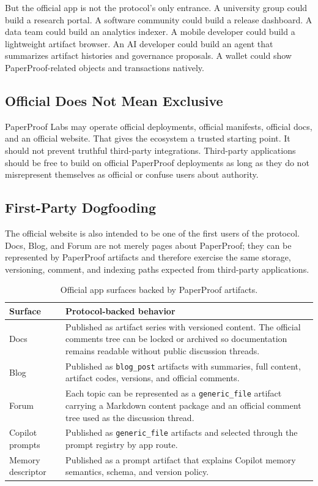 \documentclass[11pt]{article}
\newcommand{\code}[1]{\texttt{#1}}
\begin{document}
But the official app is not the protocol's only entrance. A university group
could build a research portal. A software community could build a release
dashboard. A data team could build an analytics indexer. A mobile developer
could build a lightweight artifact browser. An AI developer could build an agent
that summarizes artifact histories and governance proposals. A wallet could show
PaperProof-related objects and transactions natively.

\subsection{Official Does Not Mean Exclusive}

PaperProof Labs may operate official deployments, official manifests, official
docs, and an official website. That gives the ecosystem a trusted starting
point. It should not prevent truthful third-party integrations. Third-party
applications should be free to build on official PaperProof deployments as long
as they do not misrepresent themselves as official or confuse users about
authority.

\subsection{First-Party Dogfooding}

The official website is also intended to be one of the first users of the
protocol. Docs, Blog, and Forum are not merely pages about PaperProof; they can
be represented by PaperProof artifacts and therefore exercise the same storage,
versioning, comment, and indexing paths expected from third-party applications.

\begin{table}[htbp]
\centering
\caption{Official app surfaces backed by PaperProof artifacts.}
\begin{tabularx}{\textwidth}{p{}X}
\toprule
\textbf{Surface} & \textbf{Protocol-backed behavior} \\
\midrule
Docs & Published as artifact series with versioned content. The official comments tree can be locked or archived so documentation remains readable without public discussion threads. \\
Blog & Published as \code{blog\_post} artifacts with summaries, full content, artifact codes, versions, and official comments. \\
Forum & Each topic can be represented as a \code{generic\_file} artifact carrying a Markdown content package and an official comment tree used as the discussion thread. \\
Copilot prompts & Published as \code{generic\_file} artifacts and selected through the prompt registry by app route. \\
Memory descriptor & Published as a prompt artifact that explains Copilot memory semantics, schema, and version policy. \\
\bottomrule
\end{tabularx}
\end{table}
\end{document}
